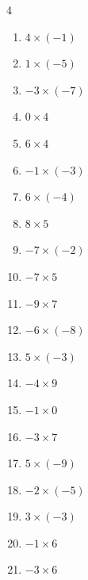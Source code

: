\begin{multicols}{4}
\begin{enumerate}
  \item $4\times (-1)$
        \phantom{$=-4$}

  \item $1\times (-5)$
        \phantom{$=-5$}

  \item $-3\times (-7)$
        \phantom{$=21$}

  \item $0\times 4$
        \phantom{$=0$}

  \item $6\times 4$
        \phantom{$=24$}

  \item $-1\times (-3)$
        \phantom{$=3$}

  \item $6\times (-4)$
        \phantom{$=-24$}

  \item $8\times 5$
        \phantom{$=40$}

  \item $-7\times (-2)$
        \phantom{$=14$}

  \item $-7\times 5$
        \phantom{$=-35$}

  \item $-9\times 7$
        \phantom{$=-63$}

  \item $-6\times (-8)$
        \phantom{$=48$}

  \item $5\times (-3)$
        \phantom{$=-15$}

  \item $-4\times 9$
        \phantom{$=-36$}

  \item $-1\times 0$
        \phantom{$=0$}

  \item $-3\times 7$
        \phantom{$=-21$}

  \item $5\times (-9)$
        \phantom{$=-45$}

  \item $-2\times (-5)$
        \phantom{$=10$}

  \item $3\times (-3)$
        \phantom{$=-9$}

  \item $-1\times 6$
        \phantom{$=-6$}

  \item $-3\times 6$
        \phantom{$=-18$}


\end{enumerate}
\end{multicols}
